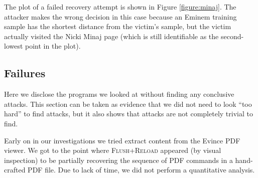 \documentclass[letterpaper,twocolumn,10pt]{article}
\begin{document}
The plot of a failed recovery attempt is shown in Figure \ref{figure:minaj}. The
attacker makes the wrong decision in this case because an Eminem training sample
has the shortest distance from the victim's sample, but the victim actually
visited the Nicki Minaj page (which is still identifiable as the second-lowest
point in the plot).

\begin{figure*}
    \centering
    
    \caption{A successful recovery. The Levenshtein distance between the
    training samples and a recording of the victim visiting the YouTube
    Wikipedia page. The shortest distance is visible at mark 68 on the page axis
    which corresponds to a YouTube training sample. The outlier at mark 29
    corresponds to a disambiguation page that has a different format from the
usual Wikipedia page. The different shapes in a column represent the five
training samples of that page. The order on the page axis is not meaningful.}
    \label{figure:youtube}
\end{figure*}

\begin{figure*}
    \centering
    
    \caption{A failed recovery. The Levenshtein distance between the training samples and
        a recording of the victim visiting the Nicki Minaj Wikipedia page. The
        shortest distance (97 on the page axis) corresponds to a training sample
        of the Eminem Wikipedia page. The Nicki Minaj training samples still
        stand out (55 on the page axis). The different shapes in a column
        represent the five training samples of that page. The order on the page
        axis is not meaningful.}
    \label{figure:minaj}
\end{figure*}

\subsection{Failures}
\label{sec:failures}

Here we disclose the programs we looked at without finding any conclusive
attacks. This section can be taken as evidence that we did not need to look
``too hard'' to find attacks, but it also shows that attacks are not completely
trivial to find.

Early on in our investigations we tried extract content from the Evince PDF
viewer. We got to the point where \textsc{Flush+Reload} appeared (by visual
inspection) to be partially recovering the sequence of PDF commands in
a hand-crafted PDF file. Due to lack of time, we did not perform a quantitative
analysis. 
\end{document}
